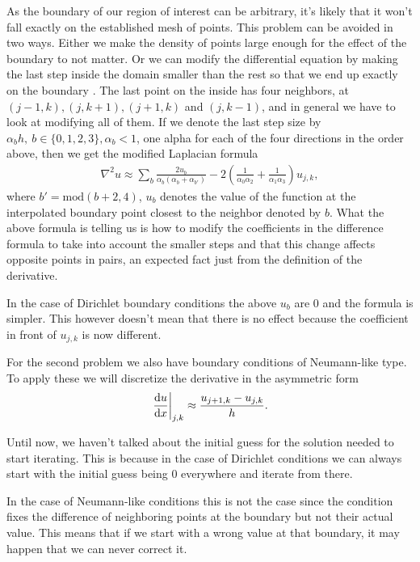 \documentclass[10pt,a4paper,twocolumn]{article}
\begin{document}
As the boundary of our region of interest can be arbitrary, it's likely that it won't fall exactly on the established mesh of points. This problem can be avoided in two ways. Either we make the density of points large enough for the effect of the boundary to not matter. Or we can modify the differential equation by making the last step inside the domain smaller than the rest so that we end up exactly on the boundary \cite{BCs}. The last point on the inside has four neighbors, at $(j-1,k), (j,k+1), (j+1,k)$ and $(j,k-1)$, and in general we have to look at modifying all of them. If we denote the last step size by $\alpha_b h, \ b \in \{0,1,2,3\}, \alpha_b < 1$, one alpha for each of the four directions in the order above, then we get the modified Laplacian formula
%
\begin{align}
    \nabla^2 u \approx \sum_b \frac{2 u_b}{\alpha_b(\alpha_b + \alpha_{b'})} - 2 \left( \frac{1}{\alpha_0 \alpha_2} + \frac{1}{\alpha_1 \alpha_3} \right) u_{j,k},
\end{align}
%
where $b' =\mathrm{mod}(b + 2,4)$, $u_b$ denotes the value of the function at the interpolated boundary point closest to the neighbor denoted by $b$. What the above formula is telling us is how to modify the coefficients in the difference formula to take into account the smaller steps and that this change affects opposite points in pairs, an expected fact just from the definition of the derivative.

In the case of Dirichlet boundary conditions the above $u_b$ are $0$ and the formula is simpler. This however doesn't mean that there is no effect because the coefficient in front of $u_{j,k}$ is now different.

For the second problem we also have boundary conditions of Neumann-like type. To apply these we will discretize the derivative in the asymmetric form
%
\begin{align}
    \left. \frac{\dif u}{\dif x}\right|_{j,k} \approx \frac{u_{j+1,k} - u_{j,k}}{h}.
\end{align}

Until now, we haven't talked about the initial guess for the solution needed to start iterating. This is because in the case of Dirichlet conditions we can always start with the initial guess being $0$ everywhere and iterate from there.

In the case of Neumann-like conditions this is not the case since the condition fixes the difference of neighboring points at the boundary but not their actual value. This means that if we start with a wrong value at that boundary, it may happen that we can never correct it.
\end{document}
